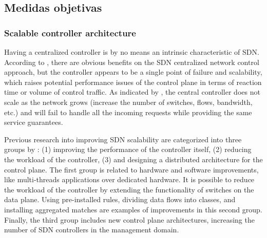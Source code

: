 

\subsection{Medidas objetivas}


\subsubsection{Scalable controller architecture}
\label{subsec:distributed}

Having a centralized controller is by no means an intrinsic characteristic of
\ac{SDN}. According to \citet{Kuklinski2014a}, there are obvious benefits on
the \ac{SDN} centralized network control approach, but the controller appears
to be a single point of failure and scalability, which raises potential
performance issues of the control plane in terms of reaction time or volume of
control traffic. As indicated by \citet{Yeganeh2013}, the central controller
does not scale as the network grows (increase the number of switches, flows,
bandwidth, etc.) and will fail to handle all the incoming requests while
providing the same service guarantees.

Previous research into improving \ac{SDN} scalability are categorized into
three groups by \citet{Sato2015}: (1) improving the performance of the
controller itself, (2) reducing the workload of the controller, (3) and
designing a distributed architecture for the control plane. The first group is
related to hardware and software improvements, like multi-threads applications
over dedicated hardware. It is possible to reduce the workload of the
controller by extending the functionality of switches on the data plane. Using
pre-installed rules, dividing data flows into classes, and installing
aggregated matches are examples of improvements in this second group. Finally,
the third group includes new control plane architectures, increasing the number
of \ac{SDN} controllers in the management domain.


